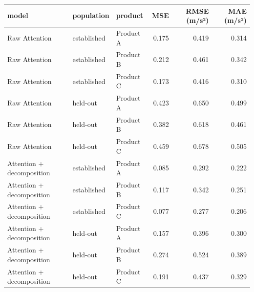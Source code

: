 \begin{tabular}{lllrrr}
\toprule
model & population & product & MSE & RMSE (m/s²) & MAE (m/s²) \\
\midrule
Raw Attention & established & Product A & 0.175 & 0.419 & 0.314 \\
Raw Attention & established & Product B & 0.212 & 0.461 & 0.342 \\
Raw Attention & established & Product C & 0.173 & 0.416 & 0.310 \\
Raw Attention & held-out & Product A & 0.423 & 0.650 & 0.499 \\
Raw Attention & held-out & Product B & 0.382 & 0.618 & 0.461 \\
Raw Attention & held-out & Product C & 0.459 & 0.678 & 0.505 \\
Attention + decomposition & established & Product A & 0.085 & 0.292 & 0.222 \\
Attention + decomposition & established & Product B & 0.117 & 0.342 & 0.251 \\
Attention + decomposition & established & Product C & 0.077 & 0.277 & 0.206 \\
Attention + decomposition & held-out & Product A & 0.157 & 0.396 & 0.300 \\
Attention + decomposition & held-out & Product B & 0.274 & 0.524 & 0.389 \\
Attention + decomposition & held-out & Product C & 0.191 & 0.437 & 0.329 \\
\bottomrule
\end{tabular}
